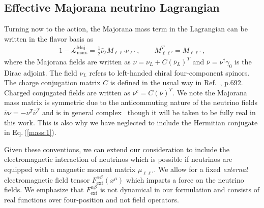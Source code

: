 \documentclass{ws-ijmpa}
\newcommand{\req}[1]{Eq.\,(\ref{#1})}
\begin{document}
\subsection{Effective Majorana neutrino Lagrangian}
\label{sec:nuaction}
Turning now to the action, the Majorana mass term in the Lagrangian can be written in the flavor basis as
\begin{alignat}{1}
\label{mass:1} -\mathcal{L}_{\mathrm{mass}}^{\mathrm{Maj.}}=\frac{1}{2}\bar\nu_{\ell}M_{\ell\ell'}\nu_{\ell'}\,,\qquad
M_{\ell\ell'}^{T}=M_{\ell\ell'}\,,
\end{alignat}
where the Majorana fields are written as $\nu=\nu_{L}+C(\bar\nu_{L})^{T}$ and $\bar\nu=\nu^{\dag}\gamma_{0}$ is the Dirac adjoint. The field $\nu_{L}$ refers to left-handed chiral four-component spinors. The charge conjugation matrix $C$ is defined in the usual way in Ref.~, p.692. Charged conjugated fields are written as $\nu^{c}=C(\bar\nu)^{T}$. We note the Majorana mass matrix is symmetric due to the anticommuting nature of the neutrino fields $\bar\nu\nu=-\nu^{T}\bar\nu^{T}$ and is in general complex~\cite{Adhikary:2013bma,giunti2007fundamentals} though it will be taken to be fully real in this work. This is also why we have neglected to include the Hermitian conjugate in \req{mass:1}.

Given these conventions, we can extend our consideration to include the electromagnetic interaction of neutrinos which is possible if neutrinos are equipped with a magnetic moment matrix $\mu_{\ell\ell'}$. We allow for a fixed \emph{external} electromagnetic field tensor $F^{\alpha\beta}_\mathrm{ext}(x^{\mu})$ which imparts a force on the neutrino fields. We emphasize that $F^{\alpha\beta}_\mathrm{ext}$ is not dynamical in our formulation and consists of real functions over four-position and not field operators.
\end{document}
